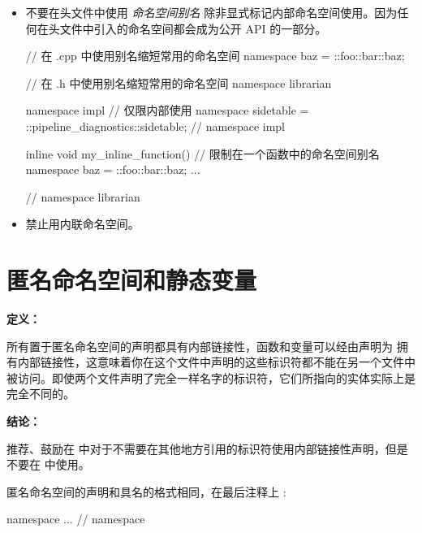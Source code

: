\begin{itemize}
  \item  不要在头文件中使用 \textit{命名空间别名} 除非显式标记内部命名空间使用。因为任何在头文件中引入的命名空间都会成为公开 API 的一部分。

\begin{cppcode}
// 在 .cpp 中使用别名缩短常用的命名空间
namespace baz = ::foo::bar::baz;
\end{cppcode}

\begin{cppcode}
// 在 .h 中使用别名缩短常用的命名空间
namespace librarian {
namespace impl {  // 仅限内部使用
namespace sidetable = ::pipeline_diagnostics::sidetable;
}  // namespace impl

inline void my_inline_function() {
  // 限制在一个函数中的命名空间别名
  namespace baz = ::foo::bar::baz;
...
}
}  // namespace librarian
\end{cppcode}

  \item  禁止用内联命名空间。
\end{itemize}

\section{匿名命名空间和静态变量} \label{unnamed-namespace-and-static-variables}


\textbf{定义：}

所有置于匿名命名空间的声明都具有内部链接性，函数和变量可以经由声明为  拥有内部链接性，这意味着你在这个文件中声明的这些标识符都不能在另一个文件中被访问。即使两个文件声明了完全一样名字的标识符，它们所指向的实体实际上是完全不同的。

\textbf{结论：}

推荐、鼓励在  中对于不需要在其他地方引用的标识符使用内部链接性声明，但是不要在  中使用。

匿名命名空间的声明和具名的格式相同，在最后注释上  :

\begin{cppcode}
namespace {
...
}  // namespace
\end{cppcode}

